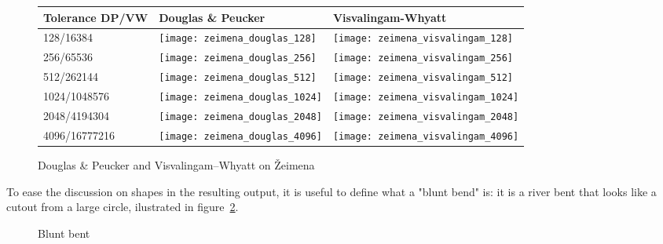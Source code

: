 \documentclass[a4paper]{article}
\newcommand{\DP}{Douglas \& Peucker}
\newcommand{\VW}{Visvalingam--Whyatt}
\begin{document}
\begin{figure}[H]
    \renewcommand{\tabularxcolumn}[1]{>{\center\small}m{#1}}
    \begin{tabularx}{\textwidth}{ p{2.1cm} | X | X | }
        Tolerance DP/VW                                                   &
        Douglas \& Peucker                                                &
        Visvalingam-Whyatt                                                \tabularnewline \hline

        128/16384                                                         &
        \texttt{[image: zeimena\_douglas\_128]}           &
        \texttt{[image: zeimena\_visvalingam\_128]}       \tabularnewline \hline

        256/65536                                                         &
        \texttt{[image: zeimena\_douglas\_256]}         &
        \texttt{[image: zeimena\_visvalingam\_256]}     \tabularnewline \hline

        512/262144                                                        &
        \texttt{[image: zeimena\_douglas\_512]}        &
        \texttt{[image: zeimena\_visvalingam\_512]}    \tabularnewline \hline

        1024/1048576                                                      &
        \texttt{[image: zeimena\_douglas\_1024]}      &
        \texttt{[image: zeimena\_visvalingam\_1024]}  \tabularnewline \hline

        2048/4194304                                                      &
        \texttt{[image: zeimena\_douglas\_2048]}     &
        \texttt{[image: zeimena\_visvalingam\_2048]} \tabularnewline \hline

        4096/16777216                                                     &
        \texttt{[image: zeimena\_douglas\_4096]}     &
        \texttt{[image: zeimena\_visvalingam\_4096]} \tabularnewline \hline
    \end{tabularx}
    \caption{{\DP} and {\VW} on Žeimena}
    \label{tab:comparison-zeimena}
\end{figure}

To ease the discussion on shapes in the resulting output, it is useful to
define what a "blunt bend" is: it is a river bent that looks like a cutout from
a large circle, ilustrated in figure~\ref{fig:blunt-bent}.

\begin{figure}[h]
    \centering
    \caption{Blunt bent}
    \label{fig:blunt-bent}
\end{figure}
\end{document}
